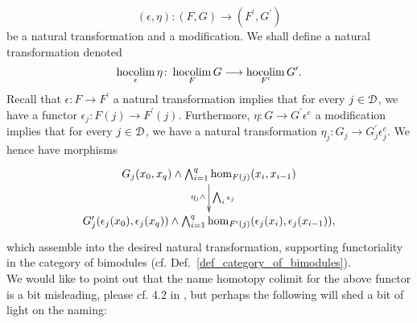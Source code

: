 \begin{defn}
\begin{displaymath}
        (\epsilon, \eta) \colon (F,G) \to (F^\prime, G^\prime)
      \end{displaymath}
      be a natural transformation and a modification.
      We shall define a natural transformation denoted
      \begin{displaymath}
        \operatorname*{hocolim}_\epsilon \eta \colon \operatorname*{hocolim}_F G \longrightarrow \operatorname*{hocolim}_{F^\prime} G^\prime.
      \end{displaymath}
      Recall that $\epsilon \colon F \to F^\prime$ a natural transformation
      implies that for every $j \in \mathcal{D}$, we have a functor $\epsilon_j \colon
      F(j) \to F^\prime(j)$.
      Furthermore, $\eta \colon G \to G^\prime \epsilon^e$ a modification
      implies that for every $j \in \mathcal{D}$, we have a natural transformation
      $\eta_j \colon G_j \to G^\prime_j\epsilon^e_j$.
      We hence have morphisms
      \begin{displaymath}
        \xymatrix{
          G_j(x_0,x_q) \wedge \bigwedge_{i=1}^q \hom_{F(j)}(x_i,x_{i-1}) %
            \ar[d]_{\eta_j \wedge}^{\bigwedge_i \epsilon_j}
          \\
          G_j^\prime(\epsilon_j(x_0),\epsilon_j(x_q)) \wedge %
            \bigwedge_{i=1}^q \hom_{F^\prime(j)}(\epsilon_j(x_i),\epsilon_j(x_{i-1})),  
        }
      \end{displaymath}
      which assemble into the desired natural transformation, supporting
      functoriality in the category of bimodules (cf.
      Def.~\ref{def_category_of_bimodules}).\\
      We would like to point out that the name homotopy colimit for the above
      functor is a bit misleading, please cf. 4.2 in \cite{brun2010covering},
      but perhaps the following will shed a bit of light on the naming:
    \end{defn}
